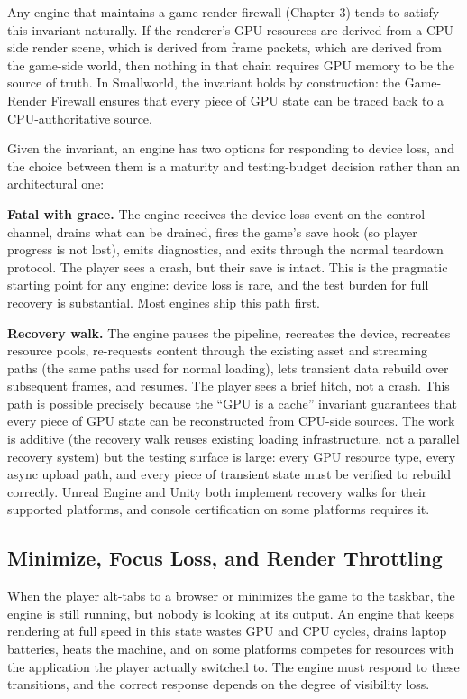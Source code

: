 \documentclass[
  11pt,
  letterpaper,
  DIV=11,
  numbers=noendperiod,
  twoside,
  open=right]{scrreprt}
\begin{document}
Any engine that maintains a game-render firewall (Chapter 3) tends to
satisfy this invariant naturally. If the renderer's GPU resources are
derived from a CPU-side render scene, which is derived from frame
packets, which are derived from the game-side world, then nothing in
that chain requires GPU memory to be the source of truth. In Smallworld,
the invariant holds by construction: the Game-Render Firewall ensures
that every piece of GPU state can be traced back to a CPU-authoritative
source.

Given the invariant, an engine has two options for responding to device
loss, and the choice between them is a maturity and testing-budget
decision rather than an architectural one:

\textbf{Fatal with grace.} The engine receives the device-loss event on
the control channel, drains what can be drained, fires the game's save
hook (so player progress is not lost), emits diagnostics, and exits
through the normal teardown protocol. The player sees a crash, but their
save is intact. This is the pragmatic starting point for any engine:
device loss is rare, and the test burden for full recovery is
substantial. Most engines ship this path first.

\textbf{Recovery walk.} The engine pauses the pipeline, recreates the
device, recreates resource pools, re-requests content through the
existing asset and streaming paths (the same paths used for normal
loading), lets transient data rebuild over subsequent frames, and
resumes. The player sees a brief hitch, not a crash. This path is
possible precisely because the ``GPU is a cache'' invariant guarantees
that every piece of GPU state can be reconstructed from CPU-side
sources. The work is additive (the recovery walk reuses existing loading
infrastructure, not a parallel recovery system) but the testing surface
is large: every GPU resource type, every async upload path, and every
piece of transient state must be verified to rebuild correctly. Unreal
Engine and Unity both implement recovery walks for their supported
platforms, and console certification on some platforms requires it.

\subsection{Minimize, Focus Loss, and Render
Throttling}\label{minimize-focus-loss-and-render-throttling}

When the player alt-tabs to a browser or minimizes the game to the
taskbar, the engine is still running, but nobody is looking at its
output. An engine that keeps rendering at full speed in this state
wastes GPU and CPU cycles, drains laptop batteries, heats the machine,
and on some platforms competes for resources with the application the
player actually switched to. The engine must respond to these
transitions, and the correct response depends on the degree of
visibility loss.
\end{document}
